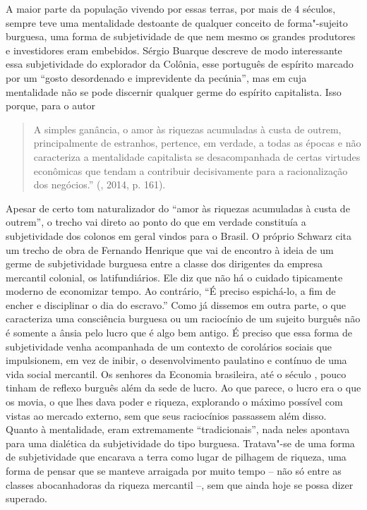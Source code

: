 A maior parte da população vivendo por essas terras, por mais de 4 séculos, sempre
teve uma mentalidade destoante de qualquer conceito de forma"-sujeito burguesa, uma
forma de subjetividade de que nem mesmo os grandes produtores e investidores eram
embebidos. Sérgio Buarque descreve de modo interessante essa
subjetividade do explorador da Colônia, esse português de espírito
marcado por um ``gosto desordenado e imprevidente da pecúnia'', mas em
cuja mentalidade não se pode discernir qualquer germe do espírito
capitalista. Isso porque, para o autor

\begin{quote}
A simples ganância, o amor às riquezas acumuladas à custa de outrem,
principalmente de estranhos, pertence, em verdade, a todas as épocas e
não caracteriza a mentalidade capitalista se desacompanhada de certas
virtudes econômicas que tendam a contribuir decisivamente para a
racionalização dos negócios.'' (, 2014, p. 161).
\end{quote}

Apesar de certo tom naturalizador do ``amor às riquezas acumuladas à
custa de outrem'', o trecho vai direto ao ponto do que em verdade
constituía a subjetividade dos colonos em geral vindos para o Brasil. O
próprio Schwarz cita um trecho de obra de Fernando Henrique que vai de
encontro à ideia de um germe de subjetividade burguesa entre a classe
dos dirigentes da empresa mercantil colonial, os latifundiários. Ele diz
que não há o cuidado tipicamente moderno de economizar tempo. Ao
contrário, ``É preciso espichá-lo, a fim de encher e disciplinar o dia
do escravo.'' Como já dissemos em outra parte, o que caracteriza uma
consciência burguesa ou um raciocínio de um sujeito burguês não é
somente a ânsia pelo lucro que é algo bem antigo. É preciso que essa
forma de subjetividade venha acompanhada de um contexto de corolários
sociais que impulsionem, em vez de inibir, o desenvolvimento paulatino
e contínuo de uma vida social mercantil. Os senhores da Economia
brasileira, até o século , pouco tinham de reflexo burguês além da
sede de lucro. Ao que parece, o lucro era o que os movia, o que lhes
dava poder e riqueza, explorando o máximo possível com vistas ao mercado
externo, sem que seus raciocínios passassem além disso. Quanto à
mentalidade, eram extremamente ``tradicionais'', nada neles apontava
para uma dialética da subjetividade do tipo burguesa. Tratava"-se de uma
forma de subjetividade que encarava a terra como lugar de pilhagem de
riqueza, uma forma de pensar que se manteve arraigada por muito tempo --
não só entre as classes abocanhadoras da riqueza mercantil --, sem que
ainda hoje se possa dizer superado.

